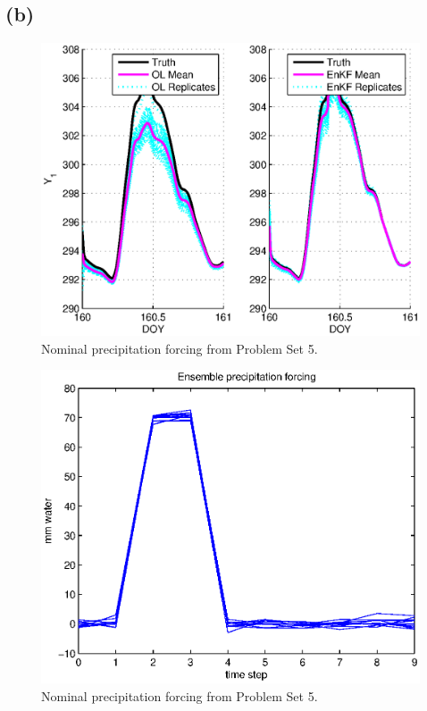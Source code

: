 \documentclass[letterpaper]{tufte-handout}
\begin{document}
\subsection{(b)}
    \begin{figure}
      \includegraphics[width=\textwidth]{3cy1}
      \caption{Nominal precipitation forcing from Problem Set 5.}
      \label{1b}
    \end{figure}
    \begin{figure}
      \includegraphics[width=\textwidth]{1b}
      \caption{Nominal precipitation forcing from Problem Set 5.}
      \label{1b}
    \end{figure}
\end{document}
